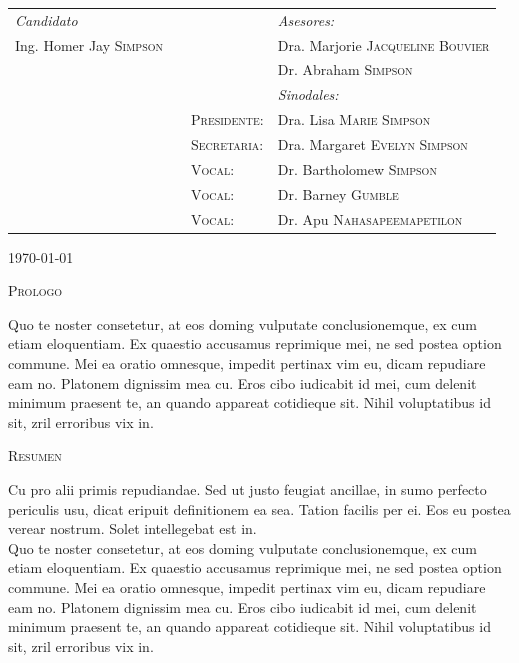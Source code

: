 \begin{titlepage}
\begin{center}
	\vspace{1em}
	\begin{tabular}{lp{.2cm}ll}
		\textit{Candidato}
		  & 
		  & 
		  & \textit{Asesores:}\\
		Ing. Homer Jay \textsc{Simpson} 
		  &
		  &
		  & Dra. Marjorie \textsc{Jacqueline Bouvier}\\
		&
		  &
		  & Dr. Abraham \textsc{Simpson}\\[2em]
		&
		&
		& \textit{Sinodales:}\\
		&
		&\textsc{Presidente}:
		& Dra. Lisa \textsc{Marie Simpson}\\[2.5em]
		&
		&\textsc{Secretaria}:
		& Dra. Margaret \textsc{Evelyn Simpson}\\[2.5em]
		&
		&\textsc{Vocal}:
		& Dr. Bartholomew \textsc{Simpson}\\[2.5em]
		&
		&\textsc{Vocal}:
		& Dr. Barney \textsc{Gumble}\\[2.5em]
		&
		&\textsc{Vocal}:
		& Dr. Apu \textsc{Nahasapeemapetilon}\\
	\end{tabular}


	\vfill
	\begin{flushright}
		\normalsize\today
	\end{flushright}

\end{center}

\end{titlepage}

\blankpage

\textsc{\Large Prologo}

Quo te noster consetetur, at eos doming vulputate conclusionemque, ex cum etiam eloquentiam. Ex quaestio accusamus reprimique mei, ne sed postea option commune. Mei ea oratio omnesque, impedit pertinax vim eu, dicam repudiare eam no. Platonem dignissim mea cu. Eros cibo iudicabit id mei, cum delenit minimum praesent te, an quando appareat cotidieque sit. Nihil voluptatibus id sit, zril erroribus vix in.

\vfill
\pagebreak


\textsc{\Large Resumen}

Cu pro alii primis repudiandae. Sed ut justo feugiat ancillae, in sumo perfecto periculis usu, dicat eripuit definitionem ea sea. Tation facilis per ei. Eos eu postea verear nostrum. Solet intellegebat est in.\\[.2em]

Quo te noster consetetur, at eos doming vulputate conclusionemque, ex cum etiam eloquentiam. Ex quaestio accusamus reprimique mei, ne sed postea option commune. Mei ea oratio omnesque, impedit pertinax vim eu, dicam repudiare eam no. Platonem dignissim mea cu. Eros cibo iudicabit id mei, cum delenit minimum praesent te, an quando appareat cotidieque sit. Nihil voluptatibus id sit, zril erroribus vix in.


 
\tableofcontents